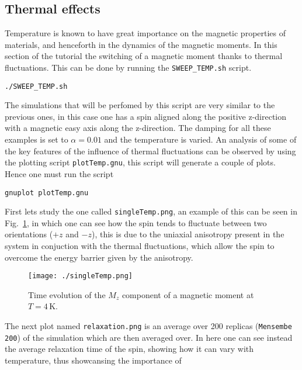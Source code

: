 \documentclass[11pt,fleqn,a4]{book} %
\begin{document}
\subsection{Thermal effects}

Temperature is known to have great importance on the magnetic properties of materials, and henceforth in the dynamics of the magnetic moments. In this section of the tutorial the switching of a magnetic moment thanks to thermal fluctuations. This can be done by running the \verb;SWEEP_TEMP.sh; script. 

\begin{fBox} 
\begin{Verbatim}
./SWEEP_TEMP.sh
\end{Verbatim}
\end{fBox}

The simulations that will be perfomed by this script are very similar to the previous ones, in this case one has a spin aligned along the positive z-direction with a magnetic easy axis along the z-direction. The damping for all these examples is set to $\alpha=0.01$ and the temperature is varied. An analysis of some of the key features of the influence of thermal fluctuations can be observed by using the plotting script \verb;plotTemp.gnu;, this script will generate a couple of plots. Hence one must run the script


\begin{fBox} 
\begin{Verbatim}
gnuplot plotTemp.gnu
\end{Verbatim}
\end{fBox}

First lets study the one called \verb;singleTemp.png;, an example of this can be seen in Fig.~\ref{fig:telegraph}, in which one can see how the spin tends to fluctuate between two orientations ($+z$ and $-z$), this is due to the uniaxial anisotropy present in the system in conjuction with the thermal fluctuations, which allow the spin to overcome the energy barrier given by the anisotropy.

\begin{figure}[h!]
\center
\texttt{[image: ./singleTemp.png]}
\caption{Time evolution of the $M_z$ component of a magnetic moment at $T=4\,\textrm{K}$. \label{fig:telegraph}}
\end{figure}

The next plot named \verb;relaxation.png; is an average over 200 replicas (\verb;Mensembe 200;) of the simulation which are then averaged over. In here one can see instead the average relaxation time of the spin, showing how it can vary with temperature, thus showcansing the importance of 
\end{document}
